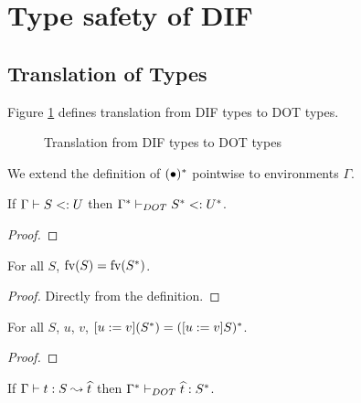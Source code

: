 \section{Type safety of DIF}

\subsection{Translation of Types}

\begin{DEFINITION}
    \label{translation}
    Figure \ref{figure_translation} defines translation from DIF types to DOT
    types.
\end{DEFINITION}

\begin{figure}[h]
    
    \caption{Translation from DIF types to DOT types}
    \label{figure_translation}
\end{figure}

We extend the definition of $(\bullet)^{*}$ pointwise to environments
$\Gamma$.

\begin{LEMMA}
    \label{pres_subtyping}
    If $\Gamma \vdash S <: U$ then $\Gamma^{*} \vdash_{DOT} S^{*} <: U^{*}$.
\end{LEMMA}

\begin{proof}
    \TODOTHIS
\end{proof}

\begin{LEMMA}
    \label{pres_fv}
    For all $S$, $\text{fv}(S) = \text{fv}(S^{*})$.
\end{LEMMA}

\begin{proof}
    Directly from the definition.
\end{proof}

\begin{LEMMA}
    \label{comm_trans_sub}
    For all $S$, $u$, $v$, $[u := v](S^{*}) = ([u := v]S)^{*}$.
\end{LEMMA}

\begin{proof}
    \TODOTHIS
\end{proof}

\begin{THEOREM}
    If $\Gamma \vdash t: S \leadsto \widehat{t}$ then
    $\Gamma^{*} \vdash_{DOT} \widehat{t}: S^{*}$.
\end{THEOREM}

